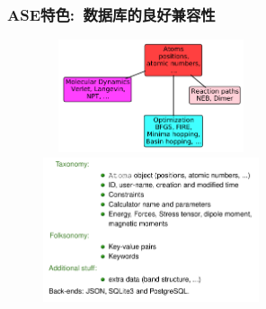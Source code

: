 {{\frame
{
\frametitle{\textrm{ASE}特色:~数据库的良好兼容性}
\begin{minipage}[b]{0.38\textwidth}
{\fontsize{7.5pt}{5.2pt}}
\end{minipage}
\hfill
\begin{minipage}[b]{0.60\textwidth}
\begin{figure}[h!]
\centering
\vspace*{-0.10in}
\includegraphics[height=1.3in,width=2.5in,viewport=0 0 838 500,clip]{Figures/ASE_opt_modules.png}
\vskip 1pt
\includegraphics[height=1.7in,width=2.5in,viewport=0 0 938 630,clip]{Figures/ASE_database.png}
\label{ASE_opt-database}
\end{figure} 
\end{minipage}
}

}}
